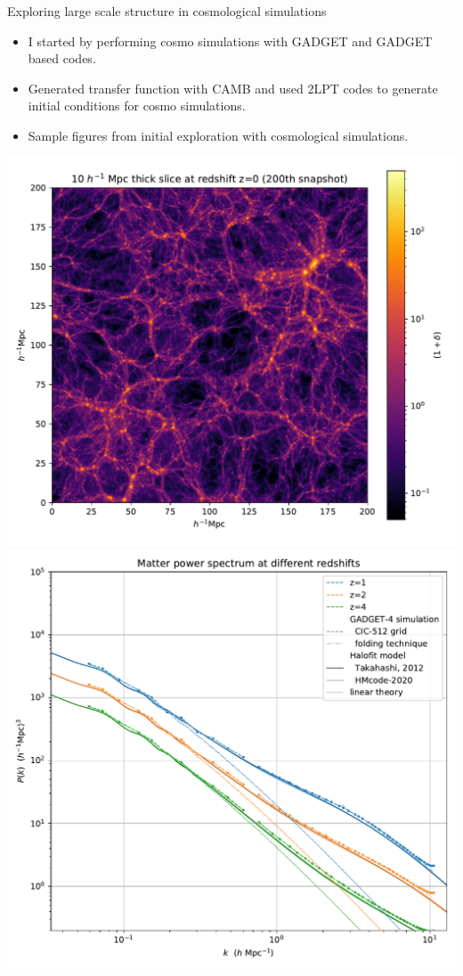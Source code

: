 \documentclass{beamer}
\begin{document}

    

\begin{frame}{Exploring large scale structure in cosmological simulations}
\begin{itemize}
    \item I started by performing cosmo simulations with GADGET and GADGET based codes.
    \item Generated transfer function with CAMB and used 2LPT codes to generate initial conditions for cosmo simulations.
    \item Sample figures from initial exploration with cosmological simulations.
\end{itemize}
    \includegraphics[width=0.485\linewidth]{figures/single_snapshot_image_200_light.pdf}
    \includegraphics[width=0.485\linewidth]{figures/single_snapshot_pk_vary_z_CIC_light.pdf}
\end{frame}
\end{document}
